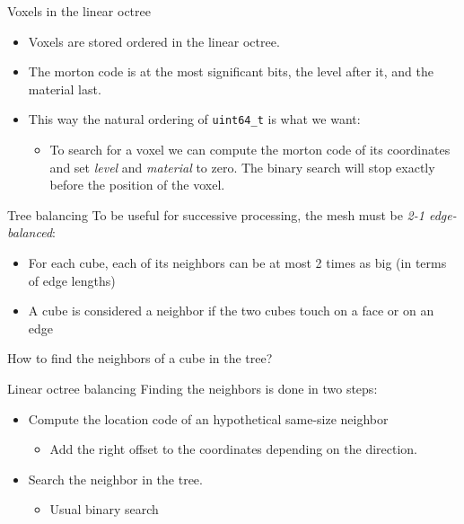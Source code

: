 \documentclass[utf8x]{beamer}
\begin{document}
\begin{frame}[fragile]{Voxels in the linear octree}
\begin{itemize}
\item Voxels are stored ordered in the linear octree.
\item The morton code is at the most significant bits, the level after it, and 
      the material last.
\item This way the natural ordering of \verb|uint64_t| is what we want:
      \begin{itemize}
      \item To search for a voxel we can compute the morton code of its 
      coordinates and set \emph{level} and \emph{material} to zero. The binary
      search will stop exactly before the position of the voxel.
      \end{itemize}
\end{itemize} 
\end{frame}

\begin{frame}{Tree balancing}
To be useful for successive processing, the mesh must be 
\emph{2-1 edge-balanced}:
\begin{itemize}
\item For each cube, each of its neighbors can be at most 2 times as 
      big (in terms of edge lengths)
\item A cube is considered a neighbor if the two cubes touch on a face or on 
      an edge
\end{itemize}
How to find the neighbors of a cube in the tree?
\end{frame}

\begin{frame}{Linear octree balancing}
Finding the neighbors is done in two steps:
\begin{itemize}
\item Compute the location code of an hypothetical same-size neighbor
      \begin{itemize}
      \item Add the right offset to the coordinates depending on the direction.
      \end{itemize}
\item Search the neighbor in the tree.
      \begin{itemize}
      \item Usual binary search
      \end{itemize}
\end{itemize}
\end{frame}
\end{document}
